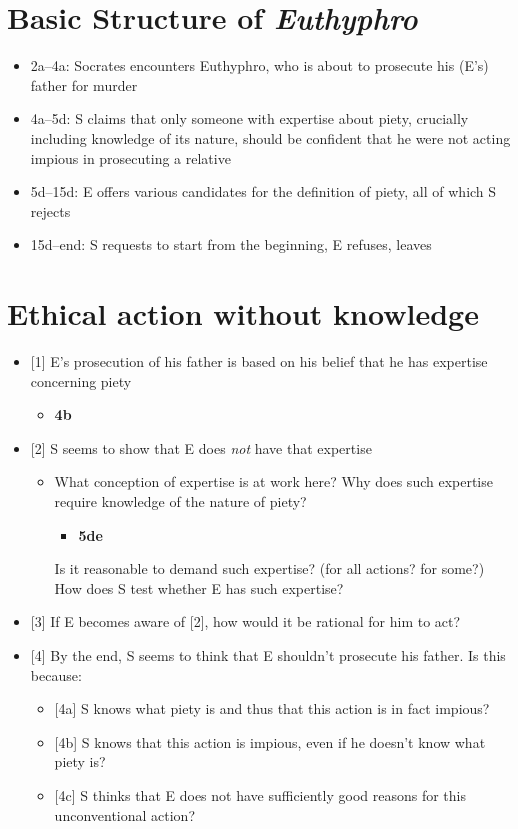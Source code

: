\documentclass[11pt]{article}
\begin{document}
\section*{Basic Structure of \emph{Euthyphro}}

\begin{itemize}\item{2a--4a: Socrates encounters Euthyphro, who is about to prosecute his (E's) father for murder}\item{4a--5d: S claims that only someone with expertise about piety, crucially including knowledge of its nature, should be confident that he were not acting impious in prosecuting a relative}\item{5d--15d: E offers various candidates for the definition of piety, all of which S rejects}\item{15d--end: S requests to start from the beginning, E refuses, leaves}\end{itemize} 

\section*{Ethical action without knowledge}
\begin{itemize}

\item{[1] E's prosecution of his father is based on his belief that he has expertise concerning piety}
\begin{itemize}\item{\textbf{4b}}\end{itemize}
\item{[2] S seems to show that E does \emph{not} have that expertise}\begin{itemize}\item{What conception of expertise is at work here? Why does such expertise require knowledge of the nature of piety?\begin{itemize}\item{\textbf{5de}}\end{itemize} Is it reasonable to demand such expertise? (for all actions? for some?) How does S test whether E has such expertise?}\end{itemize}

\item{[3] If E becomes aware of [2], how would it be rational for him to act?}

\item{[4] By the end, S seems to think that E shouldn't prosecute his father. Is this because:}\begin{itemize}\item{[4a] S knows what piety is and thus that this action is in fact impious?}\item{[4b] S knows that this action is impious, even if he doesn't know what piety is?}\item{[4c] S thinks that E does not have sufficiently good reasons for this unconventional action?}\end{itemize}\end{itemize}
\end{document}
